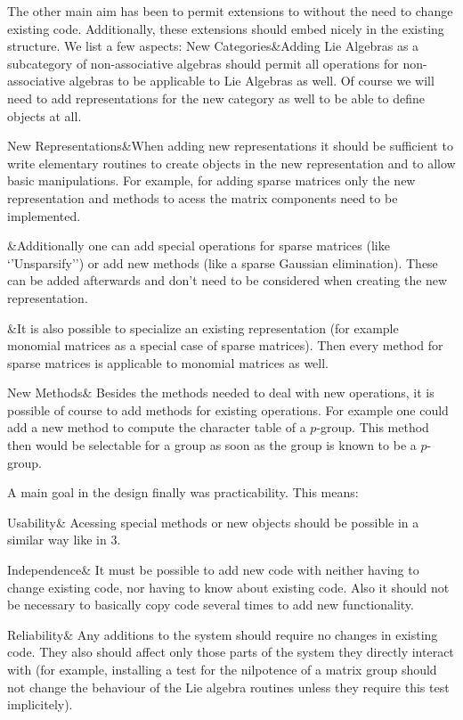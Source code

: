 
The other main aim has been to permit extensions to {\GAP} without the need to
change existing code. Additionally, these extensions should embed nicely in
the existing structure. We list a few aspects:
\beginitems
New Categories&Adding Lie Algebras as a subcategory of non-associative
algebras should permit all operations for non-associative algebras to be
applicable to Lie Algebras as well. Of course we will need to add
representations for the new category as well to be able to define objects at
all.

New Representations&When adding new representations it should be
sufficient to write elementary routines to create objects in the new
representation and to allow basic manipulations. For example, for adding
sparse matrices only the new representation and methods to acess the
matrix components need to be implemented.

&Additionally one can add special operations for sparse matrices (like
`'Unsparsify'') or add new methods (like a sparse Gaussian elimination).
These can be added afterwards and don't need to be considered when
creating the new representation.

&It is also possible to specialize an existing representation (for example
monomial matrices as a special case of sparse matrices). Then every method
for sparse matrices is applicable to monomial matrices as well.

New Methods& Besides the methods needed to deal with new
operations, it is possible of course to add methods for existing operations.
For example one could add a new method to compute the character table of a
$p$-group. This method then would be selectable for a group as soon as the
group is known to be a $p$-group.
\enditems


A main goal in the design finally was practicability. This means:

\beginitems
Usability&
Acessing special methods or new objects should be possible in a similar way
like in {\GAP} 3.

Independence& 
It must be possible to add new code with neither having to change existing
code, nor having to know about existing code. Also it should not be
necessary to basically copy code several times to add new functionality.

Reliability&
Any additions to the system should require no changes in existing code. They
also should affect only those parts of the system they directly interact
with (for example, installing a test for the nilpotence of a matrix group
should not change the behaviour of the Lie algebra routines unless they
require this test implicitely).

